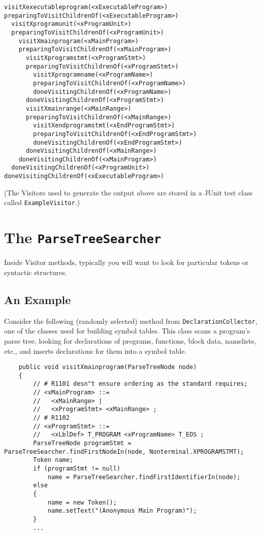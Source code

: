 \begin{verbatim}
visitXexecutableprogram(<xExecutableProgram>)
preparingToVisitChildrenOf(<xExecutableProgram>)
  visitXprogramunit(<xProgramUnit>)
  preparingToVisitChildrenOf(<xProgramUnit>)
    visitXmainprogram(<xMainProgram>)
    preparingToVisitChildrenOf(<xMainProgram>)
      visitXprogramstmt(<xProgramStmt>)
      preparingToVisitChildrenOf(<xProgramStmt>)
        visitXprogramname(<xProgramName>)
        preparingToVisitChildrenOf(<xProgramName>)
        doneVisitingChildrenOf(<xProgramName>)
      doneVisitingChildrenOf(<xProgramStmt>)
      visitXmainrange(<xMainRange>)
      preparingToVisitChildrenOf(<xMainRange>)
        visitXendprogramstmt(<xEndProgramStmt>)
        preparingToVisitChildrenOf(<xEndProgramStmt>)
        doneVisitingChildrenOf(<xEndProgramStmt>)
      doneVisitingChildrenOf(<xMainRange>)
    doneVisitingChildrenOf(<xMainProgram>)
  doneVisitingChildrenOf(<xProgramUnit>)
doneVisitingChildrenOf(<xExecutableProgram>)
\end{verbatim}

(The Visitors used to generate the output above are stored in
a JUnit test class called \texttt{ExampleVisitor}.)

\section{The \texttt{ParseTreeSearcher}}

Inside Visitor methods, typically you will want to look for particular tokens
or syntactic structures.

\subsection{An Example}

Consider the following (randomly selected) method from \texttt{DeclarationCollector},
one of the classes used for building symbol tables.
This class scans a program's parse tree, looking for declarations of programs, functions,
block data, namelists, etc., and inserts declarations for them into a symbol table.

\begin{verbatim}
    public void visitXmainprogram(ParseTreeNode node)
    {
        // # R1101 desn"t ensure ordering as the standard requires;
        // <xMainProgram> ::=
        //   <xMainRange> |
        //   <xProgramStmt> <xMainRange> ;
        // # R1102
        // <xProgramStmt> ::=
        //   <xLblDef> T_PROGRAM <xProgramName> T_EOS ;
        ParseTreeNode programStmt = ParseTreeSearcher.findFirstNodeIn(node, Nonterminal.XPROGRAMSTMT);
        Token name;
        if (programStmt != null)
	        name = ParseTreeSearcher.findFirstIdentifierIn(node);
        else
        {
	        name = new Token();
	        name.setText("(Anonymous Main Program)");
        }
        ...
\end{verbatim}

